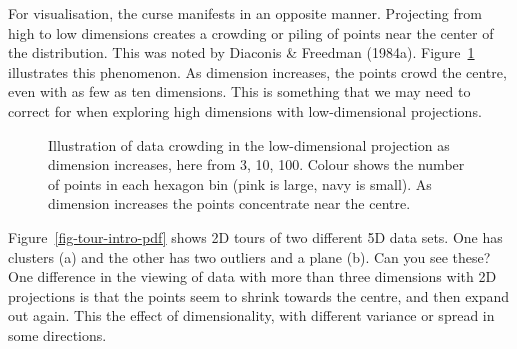 \documentclass[
  letterpaper,
]{krantz}
\begin{document}

For visualisation, the curse manifests in an opposite manner. Projecting
from high to low dimensions creates a crowding or piling of points near
the center of the distribution. This was noted by Diaconis \& Freedman
(1984a). Figure~\ref{fig-density} illustrates this phenomenon. As
dimension increases, the points crowd the centre, even with as few as
ten dimensions. This is something that we may need to correct for when
exploring high dimensions with low-dimensional projections.


\begin{figure}


\caption{\label{fig-density}Illustration of data crowding in the
low-dimensional projection as dimension increases, here from 3, 10, 100.
Colour shows the number of points in each hexagon bin (pink is large,
navy is small). As dimension increases the points concentrate near the
centre.}

\end{figure}%

Figure~\ref{fig-tour-intro-pdf} shows 2D tours of two different 5D data
sets. One has clusters (a) and the other has two outliers and a plane
(b). Can you see these? One difference in the viewing of data with more
than three dimensions with 2D projections is that the points seem to
shrink towards the centre, and then expand out again. This the effect of
dimensionality, with different variance or spread in some directions.
\end{document}

